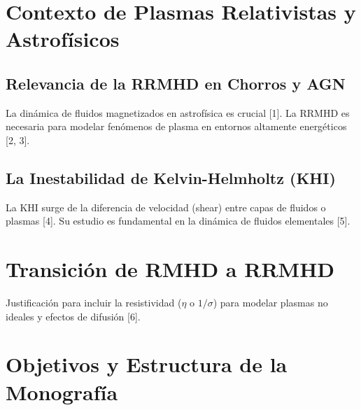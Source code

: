 \section{Contexto de Plasmas Relativistas y Astrofísicos}
    \subsection{Relevancia de la RRMHD en Chorros y AGN}
        La dinámica de fluidos magnetizados en astrofísica es crucial [1]. La RRMHD es necesaria para modelar fenómenos de plasma en entornos altamente energéticos [2, 3].
    \subsection{La Inestabilidad de Kelvin-Helmholtz (KHI)}
        La KHI surge de la diferencia de velocidad (shear) entre capas de fluidos o plasmas [4]. Su estudio es fundamental en la dinámica de fluidos elementales [5].

\section{Transición de RMHD a RRMHD}
    Justificación para incluir la resistividad ($\eta$ o $1/\sigma$) para modelar plasmas no ideales y efectos de difusión [6].

\section{Objetivos y Estructura de la Monografía}

